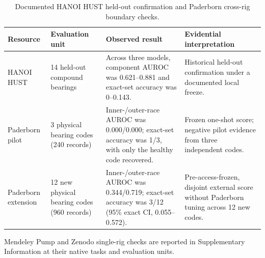 \begin{table}[t]
\centering
\footnotesize
\setlength{\tabcolsep}{4pt}
\renewcommand{\arraystretch}{1.10}
\caption{Documented HANOI HUST held-out confirmation and Paderborn cross-rig boundary checks.}
\label{tab:hanoi_boundary_results}
\begin{tabular}{p{}p{}p{}p{}}
\toprule
Resource & Evaluation unit & Observed result & Evidential interpretation \\
\midrule
HANOI HUST & 14 held-out compound bearings & Across three models, component AUROC was 0.621--0.881 and exact-set accuracy was 0--0.143. & Historical held-out confirmation under a documented local freeze. \\
Paderborn pilot & 3 physical bearing codes (240 records) & Inner-/outer-race AUROC was 0.000/0.000; exact-set accuracy was 1/3, with only the healthy code recovered. & Frozen one-shot score; negative pilot evidence from three independent codes. \\
Paderborn extension & 12 new physical bearing codes (960 records) & Inner-/outer-race AUROC was 0.344/0.719; exact-set accuracy was 3/12 (95\% exact CI, 0.055--0.572). & Pre-access-frozen, disjoint external score without Paderborn tuning across 12 new codes. \\
\bottomrule
\end{tabular}
\vspace{0.4em}
\par\small\noindent
Mendeley Pump and Zenodo single-rig checks are reported in Supplementary Information at their native tasks and evaluation units.
\end{table}
